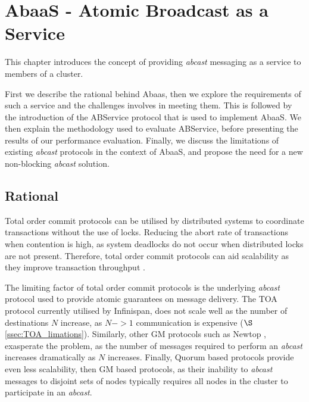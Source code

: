 \chapter{AbaaS - Atomic Broadcast as a Service}

\ifpdf
    \graphicspath{{Chapter3-TxService/Figs/Raster/}{Chapter3-TxService/Figs/PDF/}{Chapter3-TxService/Figs/}}
\else
    \graphicspath{{Chapter3-TxService/Figs/Vector/}{Chapter3-TxService/Figs/}}
\fi


This chapter introduces the concept of providing \emph{abcast} messaging as a service to members of a cluster.

First we describe the rational behind \textsf{Abaas}, then we explore the requirements of such a service and the challenges involves in meeting them.  This is followed by the introduction of the \textsf{ABService} protocol that is used to implement \textsf{AbaaS}.  We then explain the methodology used to evaluate \textsf{ABService}, before presenting the results of our performance evaluation.  Finally, we discuss the limitations of existing \emph{abcast} protocols in the context of \textsf{AbaaS}, and propose the need for a new non-blocking \emph{abcast} solution.  

\section{Rational}
Total order commit protocols can be utilised by distributed systems to coordinate transactions without the use of locks.  Reducing the abort rate of transactions when contention is high, as system deadlocks do not occur when distributed locks are not present.  Therefore, total order commit protocols can aid scalability as they improve transaction throughput \citep{Ruivo:2011:ETO:2120967.2121604}.  

The limiting factor of total order commit protocols is the underlying \emph{abcast} protocol used to provide atomic guarantees on message delivery.  The TOA protocol currently utilised by Infinispan, does not scale well as the number of destinations $N$ increase, as $N->1$ communication is expensive ($\S$ \ref{ssec:TOA_limations}).  Similarly, other GM protocols such as Newtop \citep{Ezhilchelvan:1995:NFG:876885.880005}, exasperate the problem, as the number of messages required to perform an \emph{abcast} increases dramatically as $N$ increases.  Finally, Quorum based protocols provide even less scalability, then GM based protocols, as their inability to \emph{abcast} messages to disjoint sets of nodes typically requires all nodes in the cluster to participate in an \emph{abcast}.  


